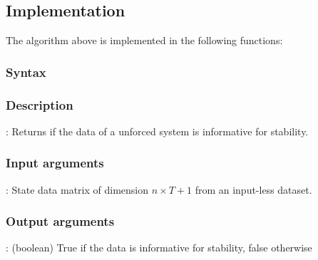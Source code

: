 

\subsection{Implementation}
The algorithm above is implemented in the following functions:
\subsubsection*{Syntax}

\subsubsection*{Description}
: Returns if the data of a unforced system is informative for stability.

\subsubsection*{Input arguments}
\textbf{}: State data matrix of dimension $n \times T+1$ from an input-less dataset.

\subsubsection*{Output arguments}
\textbf{}: (boolean) True if the data is informative for stability, false otherwise

